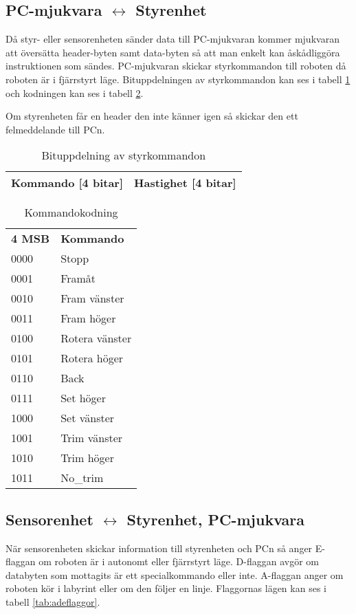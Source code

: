 \subsection{PC-mjukvara $\longleftrightarrow$ Styrenhet}
Då styr- eller sensorenheten sänder data till PC-mjukvaran kommer mjukvaran att
översätta header-byten samt data-byten så att man enkelt kan åskådliggöra
instruktionen som sändes. 
PC-mjukvaran skickar styrkommandon till roboten då roboten är i fjärrstyrt läge.
Bituppdelningen av styrkommandon kan ses i tabell \ref{tab:styrbitar} och
kodningen kan ses i tabell \ref{tab:styrkommando}.

Om styrenheten får en header den inte känner igen så skickar den ett
felmeddelande till PCn.

\begin{table}[h] 
  \centering
  \begin{tabular}{| c | c |}
    \hline
    Kommando [4 bitar] & Hastighet [4 bitar] \\ \hline
  \end{tabular}
  \caption{Bituppdelning av styrkommandon}
  \label{tab:styrbitar}
\end{table}

\begin{table}[h] 
  \centering
  \begin{tabular}{l l}
    \textbf{4 MSB} & \textbf{Kommando} \\
    0000 & Stopp \\
    0001 & Framåt \\
    0010 & Fram vänster \\
    0011 & Fram höger \\
    0100 & Rotera vänster \\
    0101 & Rotera höger \\
    0110 & Back \\
    0111 & Set höger \\
    1000 & Set vänster \\
    1001 & Trim vänster \\
    1010 & Trim höger \\
    1011 & No\_trim \\
  \end{tabular}
  \caption{Kommandokodning}
  \label{tab:styrkommando}
\end{table}


\subsection{Sensorenhet $\longleftrightarrow$ Styrenhet, PC-mjukvara}
När sensorenheten skickar information till styrenheten och PCn så anger
E-flaggan om roboten är i autonomt eller fjärrstyrt läge.
D-flaggan avgör om databyten som mottagits är ett specialkommando eller inte.
A-flaggan anger om roboten kör i labyrint eller om den följer en linje.
Flaggornas lägen kan ses i tabell \ref{tab:adeflaggor}.

